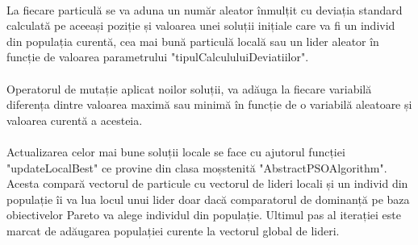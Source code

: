 \paragraph{}
La fiecare particulă se va aduna un număr aleator înmulțit cu deviația standard calculată pe aceeași poziție și valoarea unei soluții inițiale care va fi un individ din populația curentă, cea mai bună particulă locală sau un lider aleator în funcție de valoarea parametrului "tipulCalcululuiDeviatiilor".
\paragraph{}
Operatorul de mutație aplicat noilor soluții, va adăuga la fiecare variabilă diferența dintre valoarea maximă sau minimă în funcție de o variabilă aleatoare și valoarea curentă a acesteia.
\paragraph{}
Actualizarea celor mai bune soluții locale se face cu ajutorul funcției "updateLocalBest" ce provine din clasa moșstenită "AbstractPSOAlgorithm". Acesta compară vectorul de particule cu vectorul de lideri locali și un individ din populație îi va lua locul unui lider doar dacă comparatorul de dominanță pe baza obiectivelor Pareto va alege individul din populație.
Ultimul pas al iterației este marcat de adăugarea populației curente la vectorul global de lideri.
